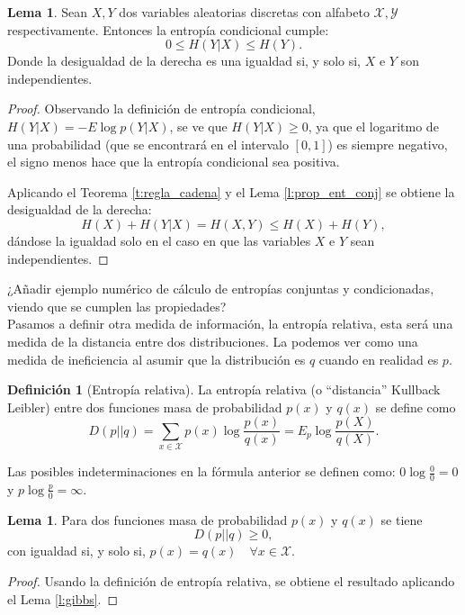 \documentclass[10pt,a4paper]{article} %
\theoremstyle{definition}
\newtheorem{definition}{Definición}[section]
\newtheorem{lemma}[theorem]{Lema}
\begin{document}
\begin{lemma}
  Sean $X, Y$ dos variables aleatorias discretas con alfabeto $\mathcal{X}, \mathcal{Y}$ respectivamente. Entonces la entropía condicional cumple:\[
0 \leq H(Y|X) \leq H(Y).
\]
Donde la desigualdad de la derecha es una igualdad si, y solo si, $X$ e $Y$ son independientes.
\end{lemma}

\begin{proof}
  Observando la definición de entropía condicional, $H(Y|X) = - E \log p(Y|X)$, se ve que $H(Y|X) \geq 0$, ya que el logaritmo de una probabilidad (que se encontrará en el intervalo $[0,1]$) es siempre negativo, el signo menos hace que la entropía condicional sea positiva.

  Aplicando el Teorema \ref{t:regla_cadena} y el Lema \ref{l:prop_ent_conj} se obtiene la desigualdad de la derecha:\[
H(X) + H(Y|X) = H(X,Y) \leq H(X) + H(Y),
\]
dándose la igualdad solo en el caso en que las variables $X$ e $Y$ sean independientes.
\end{proof}

¿Añadir ejemplo numérico de cálculo de entropías conjuntas y condicionadas, viendo que se cumplen las propiedades?\\

Pasamos a definir otra medida de información, la entropía relativa, esta será una medida de la distancia entre dos distribuciones. La podemos ver como una medida de ineficiencia al asumir que la distribución es $q$ cuando en realidad es $p$.

\begin{definition}[Entropía relativa]
  La entropía relativa (o ``distancia'' Kullback Leibler) entre dos funciones masa de probabilidad $p(x)$ y $q(x)$ se define como\[
D(p||q) = \sum_{x \in \mathcal{X}}p(x) \log \frac{p(x)}{q(x)} = E_p \log \frac{p(X)}{q(X)}.
  \]
\end{definition}
Las posibles indeterminaciones en la fórmula anterior se definen como: $0 \log \frac{0}{0} = 0$ y $p \log \frac{p}{0} = \infty$.

\begin{lemma}
  Para dos funciones masa de probabilidad $p(x)$ y $q(x)$ se tiene \[
  D(p||q) \ge 0,\]
  con igualdad si, y solo si, $p(x) = q(x) \quad \forall x \in \mathcal{X}$.
\end{lemma}
\begin{proof}
  Usando la definición de entropía relativa, se obtiene el resultado aplicando el Lema \ref{l:gibbs}.
\end{proof}
\end{document}
